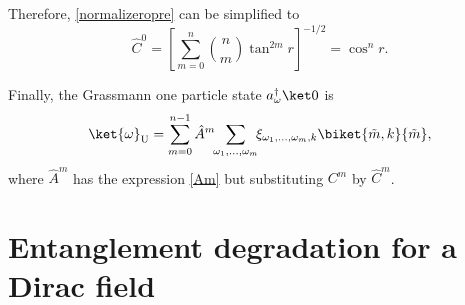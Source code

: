 Therefore, \eqref{normalizeropre} can be simplified to
\begin{equation}\label{normalizero}
\hat C^0=\left[\sum_{m=0}^n\binom{n}{m}\tan^{2m}r\right]^{-1/2}=\cos^n r.
\end{equation}
 
Finally, the Grassmann one particle state $a_\omega^\dagger\ket0$ is
\begin{equation}\label{vacuuno}
\ket{\omega}_\text{U}=\sum_{m=0}^{n-1}\hat A^m\!\!\sum_{\omega_1,\dots,\omega_m}\!\!\xi_{\omega_1,\dots,\omega_m,k}\biket{\tilde m,k}{\tilde m},
\end{equation}
where $\hat A^m$ has the expression \eqref{Am} but substituting $C^m$ by $\hat C^m$.

\section{Entanglement degradation for a Dirac field}\label{caso1}

